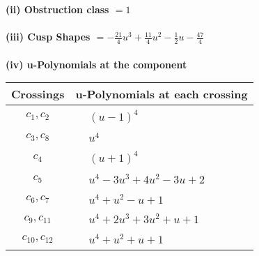 \documentclass[1p]{elsarticle_modified}
\theoremstyle{definition}
\begin{document}
\flushleft \textbf{(ii) Obstruction class $= 1$}\\~\\
\flushleft \textbf{(iii) Cusp Shapes $= -\frac{21}{4} u^3+\frac{11}{4} u^2-\frac{1}{2} u-\frac{47}{4}$}\\~\\
\newpage\renewcommand{\arraystretch}{1}
\flushleft \textbf{(iv) u-Polynomials at the component}\newline \\
\begin{tabular}{m{50pt}|m{274pt}}
Crossings & \hspace{64pt}u-Polynomials at each crossing \\
\hline $$\begin{aligned}c_{1},c_{2}\end{aligned}$$&$\begin{aligned}
&(u-1)^4
\end{aligned}$\\
\hline $$\begin{aligned}c_{3},c_{8}\end{aligned}$$&$\begin{aligned}
&u^4
\end{aligned}$\\
\hline $$\begin{aligned}c_{4}\end{aligned}$$&$\begin{aligned}
&(u+1)^4
\end{aligned}$\\
\hline $$\begin{aligned}c_{5}\end{aligned}$$&$\begin{aligned}
&u^4-3 u^3+4 u^2-3 u+2
\end{aligned}$\\
\hline $$\begin{aligned}c_{6},c_{7}\end{aligned}$$&$\begin{aligned}
&u^4+u^2- u+1
\end{aligned}$\\
\hline $$\begin{aligned}c_{9},c_{11}\end{aligned}$$&$\begin{aligned}
&u^4+2 u^3+3 u^2+u+1
\end{aligned}$\\
\hline $$\begin{aligned}c_{10},c_{12}\end{aligned}$$&$\begin{aligned}
&u^4+u^2+u+1
\end{aligned}$\\
\hline
\end{tabular}\\~\\
\end{document}
